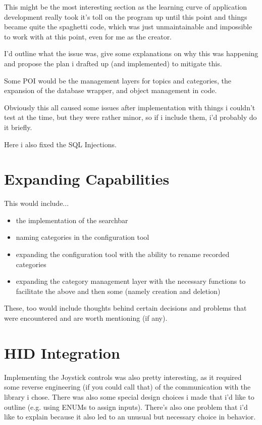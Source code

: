 This might be the most interesting section as the learning curve of application development really took it's toll on the program up until this point and things became quite the spaghetti code, which was just unmaintainable and impossible to work with at this point, even for me as the creator.

I'd outline what the issue was, give some explanations on why this was happening and propose the plan i drafted up (and implemented) to mitigate this.

Some POI would be the management layers for topics and categories, the expansion of the database wrapper, and object management in code.

Obviously this all caused some issues after implementation with things i couldn't test at the time, but they were rather minor, so if i include them, i'd probably do it briefly.

Here i also fixed the SQL Injections.

\section{Expanding Capabilities}

This would include...

\begin{itemize}
	\item the implementation of the searchbar
	\item naming categories in the configuration tool
	\item expanding the configuration tool with the ability to rename recorded categories
	\item expanding the category management layer with the necessary functions to facilitate the above and then some (namely creation and deletion)
\end{itemize}

These, too would include thoughts behind certain decisions and problems that were encountered and are worth mentioning (if any).

\section{HID Integration}

Implementing the Joystick controls was also pretty interesting, as it required some reverse engineering (if you could call that) of the communication with the library i chose.
There was also some special design choices i made that i'd like to outline (e.g. using ENUMs to assign inputs).
There's also one problem that i'd like to explain because it also led to an unusual but necessary choice in behavior.\\\\\\\\


